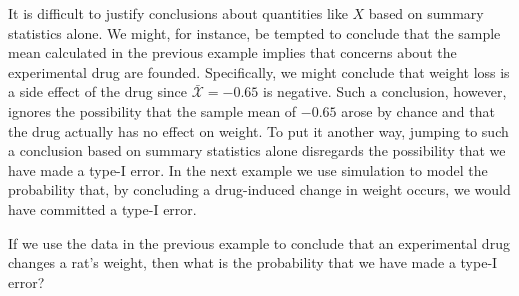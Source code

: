 \documentclass[../book.tex]{subfiles}
\begin{document}
It is difficult to justify conclusions about quantities like \(X\) based on summary statistics alone. We might, for instance, be tempted to conclude that the sample mean calculated in the previous example implies that concerns about the experimental drug are founded. Specifically, we might conclude that weight loss is a side effect of the drug since \(\bar{\mathcal{X}} =-0.65\) is negative. Such a conclusion, however, ignores the possibility that the sample mean of \(-0.65\) arose by chance and that the drug actually has no effect on weight. To put it another way, jumping to such a conclusion based on summary statistics alone disregards the possibility that we have made a type-I error. In the next example we use simulation to model the probability that, by concluding a drug-induced change in weight occurs, we would have committed a type-I error.

\begin{example} \label{eg:ttest}
If we use the data in the previous example to conclude that an experimental drug changes a rat's weight, then what is the probability that we have made a type-I error?
\end{example}
\end{document}
